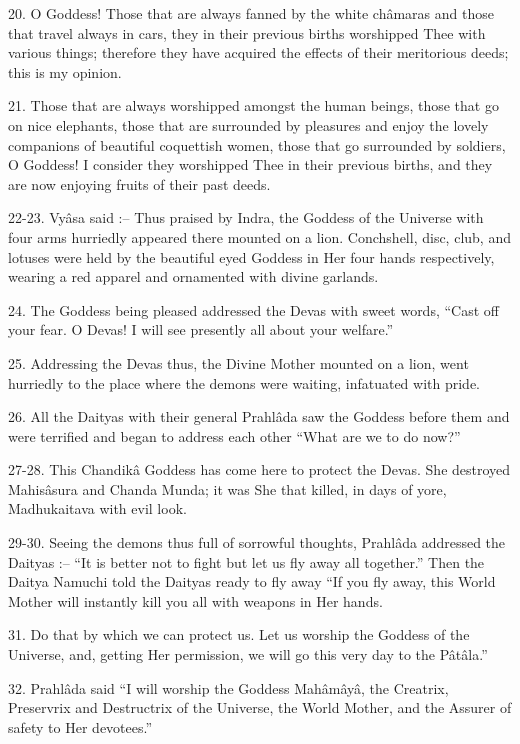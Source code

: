 20. O Goddess! Those that are always fanned by the white ch\^amaras and those that travel always in cars, they in their previous births worshipped Thee with various things; therefore they have acquired the effects of their meritorious deeds; this is my opinion.

21. Those that are always worshipped amongst the human beings, those that go on nice elephants, those that are surrounded by pleasures and enjoy the lovely companions of beautiful coquettish women, those that go surrounded by soldiers, O Goddess! I consider they worshipped Thee in their previous births, and they are now enjoying fruits of their past deeds.

22-23. Vy\^asa said :-- Thus praised by Indra, the Goddess of the Universe with four arms hurriedly appeared there mounted on a lion. Conchshell, disc, club, and lotuses were held by the beautiful eyed Goddess in Her four hands respectively, wearing a red apparel and ornamented with divine garlands.

24. The Goddess being pleased addressed the Devas with sweet words, ``Cast off your fear. O Devas! I will see presently all about your welfare.''

25. Addressing the Devas thus, the Divine Mother mounted on a lion, went hurriedly to the place where the demons were waiting, infatuated with pride.

26. All the Daityas with their general Prahl\^ada saw the Goddess before them and were terrified and began to address each other ``What are we to do now?''

27-28. This Chandik\^a Goddess has come here to protect the Devas. She destroyed Mahis\^asura and Chanda Munda; it was She that killed, in days of yore, Madhukaitava with evil look.

29-30. Seeing the demons thus full of sorrowful thoughts, Prahl\^ada addressed the Daityas :-- ``It is better not to fight but let us fly away all together.'' Then the Daitya Namuchi told the Daityas ready to fly away ``If you fly away, this World Mother will instantly kill you all with weapons in Her hands.

31. Do that by which we can protect us. Let us worship the Goddess of the Universe, and, getting Her permission, we will go this very day to the P\^at\^ala.''

32. Prahl\^ada said ``I will worship the Goddess Mah\^am\^ay\^a, the Creatrix, Preservrix and Destructrix of the Universe, the World Mother, and the Assurer of safety to Her devotees.''

